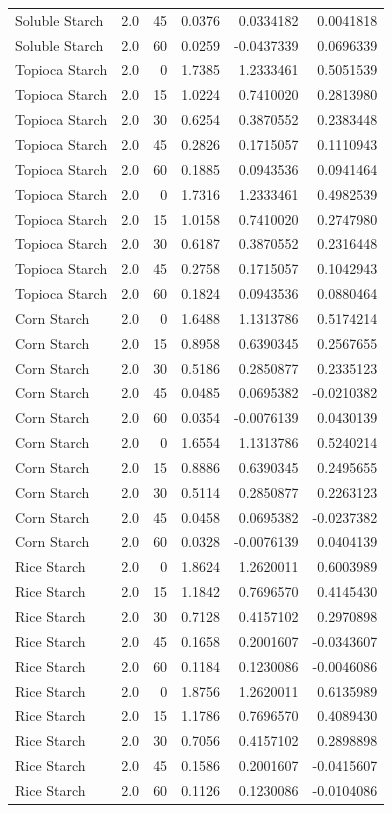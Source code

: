 \documentclass[
  12pt,
]{article}
\begin{document}
{\begin{longtable}[]{@{}lrrrrr@{}}
Soluble Starch & 2.0 & 45 & 0.0376 & 0.0334182 & 0.0041818 \\
Soluble Starch & 2.0 & 60 & 0.0259 & -0.0437339 & 0.0696339 \\
Topioca Starch & 2.0 & 0 & 1.7385 & 1.2333461 & 0.5051539 \\
Topioca Starch & 2.0 & 15 & 1.0224 & 0.7410020 & 0.2813980 \\
Topioca Starch & 2.0 & 30 & 0.6254 & 0.3870552 & 0.2383448 \\
Topioca Starch & 2.0 & 45 & 0.2826 & 0.1715057 & 0.1110943 \\
Topioca Starch & 2.0 & 60 & 0.1885 & 0.0943536 & 0.0941464 \\
Topioca Starch & 2.0 & 0 & 1.7316 & 1.2333461 & 0.4982539 \\
Topioca Starch & 2.0 & 15 & 1.0158 & 0.7410020 & 0.2747980 \\
Topioca Starch & 2.0 & 30 & 0.6187 & 0.3870552 & 0.2316448 \\
Topioca Starch & 2.0 & 45 & 0.2758 & 0.1715057 & 0.1042943 \\
Topioca Starch & 2.0 & 60 & 0.1824 & 0.0943536 & 0.0880464 \\
Corn Starch & 2.0 & 0 & 1.6488 & 1.1313786 & 0.5174214 \\
Corn Starch & 2.0 & 15 & 0.8958 & 0.6390345 & 0.2567655 \\
Corn Starch & 2.0 & 30 & 0.5186 & 0.2850877 & 0.2335123 \\
Corn Starch & 2.0 & 45 & 0.0485 & 0.0695382 & -0.0210382 \\
Corn Starch & 2.0 & 60 & 0.0354 & -0.0076139 & 0.0430139 \\
Corn Starch & 2.0 & 0 & 1.6554 & 1.1313786 & 0.5240214 \\
Corn Starch & 2.0 & 15 & 0.8886 & 0.6390345 & 0.2495655 \\
Corn Starch & 2.0 & 30 & 0.5114 & 0.2850877 & 0.2263123 \\
Corn Starch & 2.0 & 45 & 0.0458 & 0.0695382 & -0.0237382 \\
Corn Starch & 2.0 & 60 & 0.0328 & -0.0076139 & 0.0404139 \\
Rice Starch & 2.0 & 0 & 1.8624 & 1.2620011 & 0.6003989 \\
Rice Starch & 2.0 & 15 & 1.1842 & 0.7696570 & 0.4145430 \\
Rice Starch & 2.0 & 30 & 0.7128 & 0.4157102 & 0.2970898 \\
Rice Starch & 2.0 & 45 & 0.1658 & 0.2001607 & -0.0343607 \\
Rice Starch & 2.0 & 60 & 0.1184 & 0.1230086 & -0.0046086 \\
Rice Starch & 2.0 & 0 & 1.8756 & 1.2620011 & 0.6135989 \\
Rice Starch & 2.0 & 15 & 1.1786 & 0.7696570 & 0.4089430 \\
Rice Starch & 2.0 & 30 & 0.7056 & 0.4157102 & 0.2898898 \\
Rice Starch & 2.0 & 45 & 0.1586 & 0.2001607 & -0.0415607 \\
Rice Starch & 2.0 & 60 & 0.1126 & 0.1230086 & -0.0104086 \\
\end{longtable}
}
\end{document}
